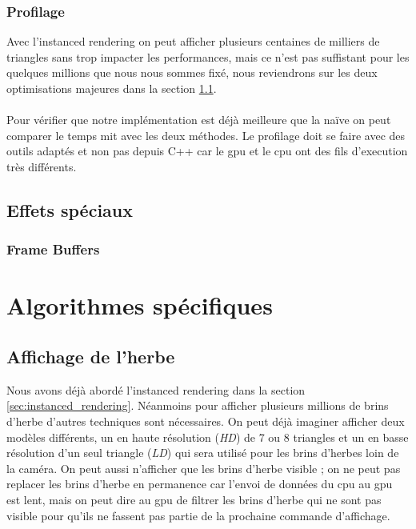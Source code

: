 \documentclass[11pt]{article} %
\begin{document}
\subsubsection{Profilage}
Avec l'instanced rendering on peut afficher plusieurs centaines de milliers de triangles sans trop impacter les performances, mais ce n'est pas suffistant pour les quelques millions que nous nous sommes fixé, nous reviendrons sur les deux optimisations majeures dans la section \ref{section:grass_rendering}.
\paragraph{}
 Pour vérifier que notre implémentation est déjà meilleure que la naïve on peut comparer le temps mit avec les deux méthodes. Le profilage doit se faire avec des outils adaptés et non pas depuis C++ car le gpu et le cpu ont des fils d'execution très différents.


\subsection{Effets spéciaux}


\subsubsection{Frame Buffers} %
\label{sec:framebuffers}



\section{Algorithmes spécifiques}


\subsection{Affichage de l'herbe}
\label{section:grass_rendering}

Nous avons déjà abordé l'instanced rendering dans la section \ref{sec:instanced_rendering}. Néanmoins pour afficher plusieurs millions de brins d'herbe d'autres techniques sont nécessaires. On peut déjà imaginer afficher deux modèles différents, un en haute résolution (\textit{HD}) de 7 ou 8 triangles et un en basse résolution d'un seul triangle (\textit{LD}) qui sera utilisé pour les brins d'herbes loin de la caméra. On peut aussi n'afficher que les brins d'herbe visible ; on ne peut pas replacer les brins d'herbe en permanence car l'envoi de données du cpu au gpu est lent, mais on peut dire au gpu de filtrer les brins d'herbe qui ne sont pas visible pour qu'ils ne fassent pas partie de la prochaine commande d'affichage.
\end{document}
